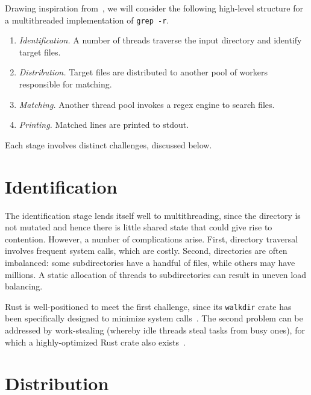 \documentclass[letterpaper,twocolumn,10pt]{article}
\newcommand{\grepr}{\texttt{grep -r}}
\begin{document}
Drawing inspiration from~\cite{gallantRipgrepBlog}, we will consider the following high-level structure for a multithreaded implementation of \grepr{}.
\begin{enumerate}
    \item
        \emph{Identification.}
        A number of threads traverse the input directory and identify target files.
    \item 
        \emph{Distribution.}
        Target files are distributed to another pool of workers responsible for matching. 
    \item
        \emph{Matching.}
        Another thread pool invokes a regex engine to search files.
    \item
        \emph{Printing.}
        Matched lines are printed to stdout.
\end{enumerate}
Each stage involves distinct challenges, discussed below.

\section{Identification}

The identification stage lends itself well to multithreading, since the directory is not mutated and hence there is little shared state that could give rise to contention.
However, a number of complications arise.
First, directory traversal involves frequent system calls, which are costly.
Second, directories are often imbalanced: some subdirectories have a handful of files, while others may have millions.
A static allocation of threads to subdirectories can result in uneven load balancing.


Rust is well-positioned to meet the first challenge, since its \texttt{walkdir} crate has been specifically designed to minimize system calls~\cite{walkdir}.
The second problem can be addressed by work-stealing (whereby idle threads steal tasks from busy ones), for which a highly-optimized Rust crate also exists~\cite{deque}.

\section{Distribution}
\end{document}

